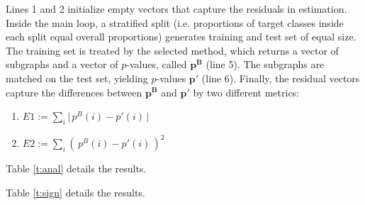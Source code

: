 \documentclass{article}
\begin{document}
Lines 1 and 2 initialize empty vectors that capture the residuals in estimation. Inside the main loop, a stratified split (i.e. proportions of target classes inside each split equal overall proportions) generates training and test set of equal size. The training set is treated by the selected method, which returns a vector of subgraphs and a vector of $p$-values, called $\mathbf{p^B}$ (line 5). The subgraphs are matched on the test set, yielding $p$-values $\mathbf{p'}$ (line 6). Finally, the residual vectors capture the differences between $\mathbf{p^B}$ and  $\mathbf{p'}$ by two different metrics:
\begin{enumerate}
  \item $E1 := \sum_i \Big|\,p^B(i) -p'(i) \,\Big|$
  \item $E2 := \sum_i \left(\, p^B(i) -p'(i) \,\right)^2$
\end{enumerate}

Table \ref{t:anal} details the results. 


Table \ref{t:sign} details the results. 




\end{document}
